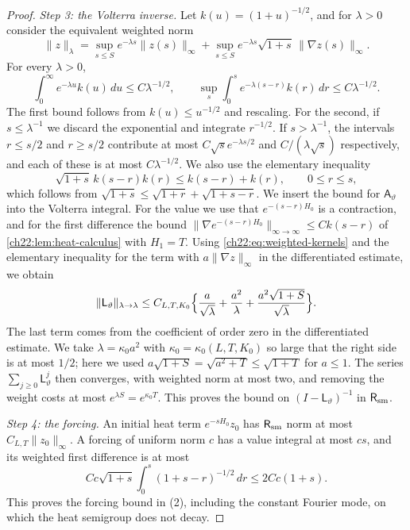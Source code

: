 \begin{proof}
\emph{Step 3: the Volterra inverse.} Let $k(u)=(1+u)^{-1/2}$, and for $\lambda>0$ consider the equivalent weighted norm
\[
 \|z\|_\lambda=\sup_{s\le S}e^{-\lambda s}\|z(s)\|_\infty+\sup_{s\le S}e^{-\lambda s}\sqrt{1+s}\,\|\nabla z(s)\|_\infty .
\]
For every $\lambda>0$,
\begin{equation}\label{ch22:eq:weighted-kernels}
 \int_0^\infty e^{-\lambda u}k(u)\,du\le C\lambda^{-1/2},\qquad
 \sup_s\int_0^se^{-\lambda(s-r)}k(r)\,dr\le C\lambda^{-1/2}.
\end{equation}
The first bound follows from $k(u)\le u^{-1/2}$ and rescaling. For the second, if $s\le\lambda^{-1}$ we discard the exponential and integrate $r^{-1/2}$. If $s>\lambda^{-1}$, the intervals $r\le s/2$ and $r\ge s/2$ contribute at most $C\sqrt se^{-\lambda s/2}$ and $C/(\lambda\sqrt s)$ respectively, and each of these is at most $C\lambda^{-1/2}$. We also use the elementary inequality
\[
 \sqrt{1+s}\,k(s-r)k(r)\le k(s-r)+k(r),\qquad 0\le r\le s,
\]
which follows from $\sqrt{1+s}\le\sqrt{1+r}+\sqrt{1+s-r}$. We insert the bound for $\mathsf A_\vartheta$ into the Volterra integral. For the value we use that $e^{-(s-r)H_0}$ is a contraction, and for the first difference the bound $\|\nabla e^{-(s-r)H_0}\|_{\infty\to\infty}\le Ck(s-r)$ of \cref{ch22:lem:heat-calculus} with $H_1=T$. Using \eqref{ch22:eq:weighted-kernels} and the elementary inequality for the term with $a\|\nabla z\|_\infty$ in the differentiated estimate, we obtain
\begin{equation}\label{ch22:eq:resolvent-contraction}
 \|\mathsf L_\vartheta\|_{\lambda\to\lambda}\le C_{L,T,K_0}\Bigl\{\frac a{\sqrt\lambda}+\frac{a^2}{\lambda}+\frac{a^2\sqrt{1+S}}{\sqrt\lambda}\Bigr\}.
\end{equation}
The last term comes from the coefficient of order zero in the differentiated estimate. We take $\lambda=\kappa_0a^2$ with $\kappa_0=\kappa_0(L,T,K_0)$ so large that the right side is at most $1/2$; here we used $a\sqrt{1+S}=\sqrt{a^2+T}\le\sqrt{1+T}$ for $a\le1$. The series $\sum_{j\ge0}\mathsf L_\vartheta^j$ then converges, with weighted norm at most two, and removing the weight costs at most $e^{\lambda S}=e^{\kappa_0T}$. This proves the bound on $(I-\mathsf L_\vartheta)^{-1}$ in $\mathsf R_{\rm sm}$.

\emph{Step 4: the forcing.} An initial heat term $e^{-sH_0}z_0$ has $\mathsf R_{\rm sm}$ norm at most $C_{L,T}\|z_0\|_\infty$. A forcing of uniform norm $c$ has a value integral at most $cs$, and its weighted first difference is at most
\[
 Cc\sqrt{1+s}\int_0^s(1+s-r)^{-1/2}\,dr\le2Cc(1+s).
\]
This proves the forcing bound in (2), including the constant Fourier mode, on which the heat semigroup does not decay.


\end{proof}

